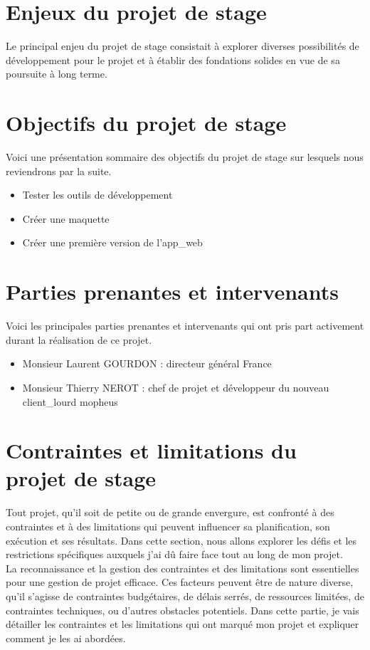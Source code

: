 \documentclass[a4paper, 12pt, french]{article}
\newcommand{\bdot}{\item[\color{ssiYellow}\ding{108}]}
\begin{document}
				\section{Enjeux du projet de stage}
					Le principal enjeu du projet de stage consistait à explorer diverses possibilités de développement pour le projet et à établir des fondations solides en vue de sa poursuite à long terme.
				
				\section{Objectifs du projet de stage}
					Voici une présentation sommaire des objectifs du projet de stage sur lesquels nous reviendrons par la suite.
					\begin{itemize}
						\bdot{Tester les outils de développement}
						\bdot{Créer une maquette}
						\bdot{Créer une première version de l'\gls{app_web}}
					\end{itemize}

				\section{Parties prenantes et intervenants}
					\noindent Voici les principales parties prenantes et intervenants qui ont pris part activement durant la réalisation de ce projet.

					\begin{itemize}
						\bdot{Monsieur Laurent GOURDON : directeur général France}
						\bdot{Monsieur Thierry NEROT : chef de projet et développeur du nouveau \gls{client_lourd} mopheus}
					\end{itemize}
				
				\section{Contraintes et limitations du projet de stage}
					Tout projet, qu'il soit de petite ou de grande envergure, est confronté à des contraintes et à des limitations qui peuvent influencer sa planification, son exécution et ses résultats. Dans cette section, nous allons explorer les défis et les restrictions spécifiques auxquels j'ai dû faire face tout au long de mon projet.\\

					La reconnaissance et la gestion des contraintes et des limitations sont essentielles pour une gestion de projet efficace. Ces facteurs peuvent être de nature diverse, qu'il s'agisse de contraintes budgétaires, de délais serrés, de ressources limitées, de contraintes techniques, ou d'autres obstacles potentiels. Dans cette partie, je vais détailler les contraintes et les limitations qui ont marqué mon projet et expliquer comment je les ai abordées.
					
\end{document}
